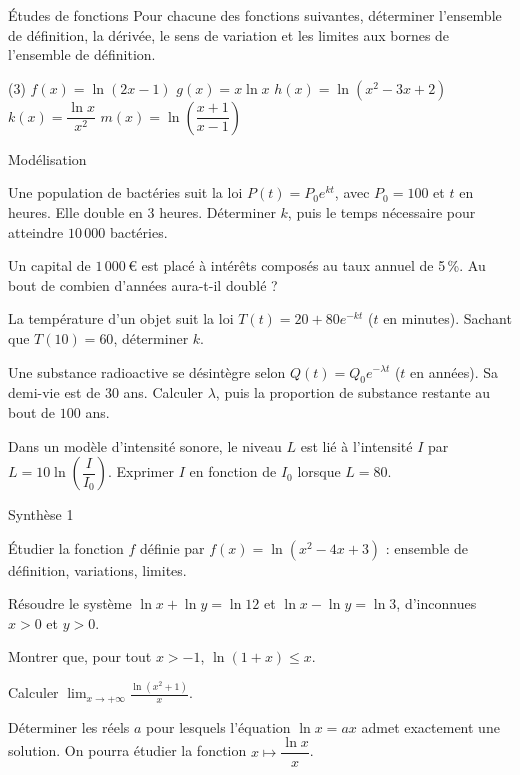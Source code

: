 \begin{exercice}[2]{Études de fonctions}
Pour chacune des fonctions suivantes, déterminer l'ensemble de définition, la dérivée, le sens de variation
et les limites aux bornes de l'ensemble de définition.
\begin{tasks}(3)
  \task $f(x)=\ln(2x-1)$
  \task $g(x)=x\ln x$
  \task $h(x)=\ln\left(x^{2}-3x+2\right)$
  \task $k(x)=\dfrac{\ln x}{x^{2}}$
  \task $m(x)=\ln\left(\dfrac{x+1}{x-1}\right)$
\end{tasks}
\end{exercice}


\begin{exercice}[2]{Modélisation}
\begin{questions}
  \item Une population de bactéries suit la loi $P(t)=P_0e^{kt}$, avec $P_0=100$ et $t$ en heures. Elle double en
    $3$ heures. Déterminer $k$, puis le temps nécessaire pour atteindre $10\,000$ bactéries.
  \item Un capital de $1\,000$\,€ est placé à intérêts composés au taux annuel de 5\,\%. Au bout de combien d'années
    aura-t-il doublé ?
  \item La température d'un objet suit la loi $T(t)=20+80e^{-kt}$ ($t$ en minutes). Sachant que $T(10)=60$, déterminer $k$.
  \item Une substance radioactive se désintègre selon $Q(t)=Q_0e^{-\lambda t}$ ($t$ en années). Sa demi-vie est de
    $30$ ans. Calculer $\lambda$, puis la proportion de substance restante au bout de $100$ ans.
  \item Dans un modèle d'intensité sonore, le niveau $L$ est lié à l'intensité $I$ par $L=10\ln\left(\dfrac{I}{I_0}\right)$.
    Exprimer $I$ en fonction de $I_0$ lorsque $L=80$.
\end{questions}
\end{exercice}

\begin{exercice}[3]{Synthèse 1}
\begin{questions}
  \item Étudier la fonction $f$ définie par $f(x)=\ln\left(x^{2}-4x+3\right)$ : ensemble de définition, variations, limites.
  \item Résoudre le système $\ln x+\ln y=\ln12$ et $\ln x-\ln y=\ln3$, d'inconnues $x>0$ et $y>0$.
  \item Montrer que, pour tout $x>-1$, $\ln(1+x)\leq x$.
  \item Calculer $\displaystyle\lim_{x\to+\infty}\frac{\ln\left(x^{2}+1\right)}{x}$.
  \item Déterminer les réels $a$ pour lesquels l'équation $\ln x=ax$ admet exactement une solution. On pourra étudier
    la fonction $x\mapsto\dfrac{\ln x}{x}$.
\end{questions}
\end{exercice}

